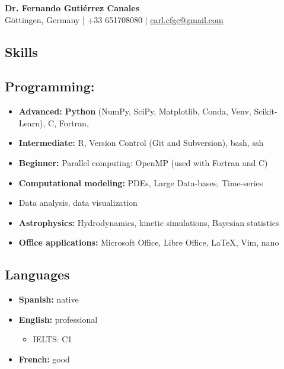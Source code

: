 \documentclass[11pt,a4paper]{article}
\begin{document}
	
	\begin{center}
		{\Huge\bfseries Dr. Fernando Guti\'errez Canales}\\[8pt]
		Göttingen, Germany | +33 651708080 | \href{mailto:carl.cfgc@gmail.com}{carl.cfgc@gmail.com}
	\end{center}
	
	\vspace{10pt}
	
	\begin{multicols}{2}
		
		\section{Skills}
		
		\subsection{Programming:}
		\begin{itemize}
			\item \textbf{Advanced:} \textbf{Python} (NumPy, SciPy, Matplotlib, Conda, Venv, Scikit-Learn), C, Fortran,
			\item \textbf{Intermediate:} R, Version Control (Git and Subversion), bash, ssh
			\item \textbf{Beginner:} Parallel computing: OpenMP (used with Fortran and C)
			\item \textbf{Computational modeling:} PDEs, Large Data-bases, Time-series
			\item Data analysis, data visualization
			\item \textbf{Astrophysics:} Hydrodynamics, kinetic simulations, Bayesian statistics
			\item \textbf{Office applications:} Microsoft Office, Libre Office, \LaTeX , Vim, nano
		\end{itemize}
		
		\subsection{Languages}
		\begin{itemize}
			\item \textbf{Spanish:} native
			\item \textbf{English:} professional
			\begin{itemize}
				\item IELTS: C1
			\end{itemize}
			\item \textbf{French:} good
		\end{itemize}
		

\end{multicols}
\end{document}

